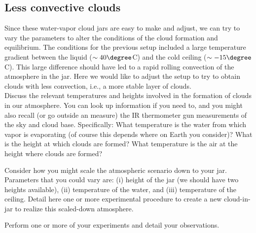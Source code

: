 \answerspace[7cm]


\subsection{Less convective clouds}

Since these water-vapor cloud jars are easy to make and adjust, we can try to vary the parameters to alter the conditions of the cloud formation and equilibrium.  The conditions for the previous setup included a large temperature gradient between the liquid ($\sim40\degree$C) and the cold ceiling ($\sim-15\degree$C).  This large difference should have led to a rapid rolling convection of the atmosphere in the jar.  Here we would like to adjust the setup to try to obtain clouds with less convection, i.e., a more stable layer of clouds.  \\[-6pt]

\noindent Discuss the relevant temperatures and heights involved in the formation of clouds in our atmosphere.  You can look up information if you need to, and you might also recall (or go outside an measure) the IR thermometer gun measurements of the sky and cloud base.  Specifically: What temperature is the water from which vapor is evaporating (of course this depends where on Earth you consider)? What is the height at which clouds are formed?  What temperature is the air at the height where clouds are formed?

\answerspace[7cm]

\noindent Consider how you might scale the atmospheric scenario down to your jar.  Parameters that you could vary are: (i) height of the jar (we should have two heights available), (ii) temperature of the water, and (iii) temperature of the ceiling.  Detail here one or more experimental procedure to create a new cloud-in-jar to realize this scaled-down atmosphere.  

\answerspace[7cm]

\noindent Perform one or more of your experiments and detail your observations.

	

\answerspace[7cm]



 